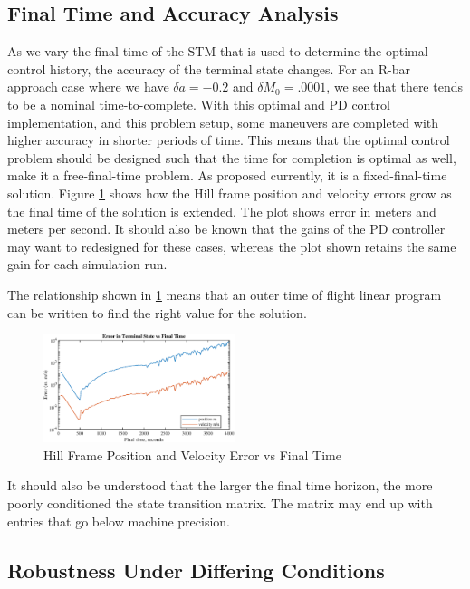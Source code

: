 \documentclass[conf]{new-aiaa}
\begin{document}
\begin{singlespace}
\subsection{Final Time and Accuracy Analysis}
As we vary the final time of the STM that is used to determine the optimal control history, the accuracy of the terminal state changes. For an R-bar approach case where we have $\delta a = -0.2$ and $\delta M_0 = .0001$, we see that there tends to be a nominal time-to-complete. With this optimal and PD control implementation, and this problem setup, some maneuvers are completed with higher accuracy in shorter periods of time. This means that the optimal control problem should be designed such that the time for completion is optimal as well, make it a free-final-time problem. As proposed currently, it is a fixed-final-time solution. Figure \ref{fig:finaltime} shows how the Hill frame position and velocity errors grow as the final time of the solution is extended. The plot shows error in meters and meters per second. It should also be known that the gains of the PD controller may want to redesigned for these cases, whereas the plot shown retains the same gain for each simulation run.

The relationship shown in \ref{fig:finaltime} means that an outer time of flight linear program can be written to find the right value for the solution. 
%
\begin{figure}[!htbp] 
  \centering
  \includegraphics[width=0.5\textwidth]{figures/finaltime.eps}
  \caption{Hill Frame Position and Velocity Error vs Final Time}
  \label{fig:finaltime}
 \end{figure}
 It should also be understood that the larger the final time horizon, the more poorly conditioned the state transition matrix. The matrix may end up with entries that go below machine precision.
%
\subsection{Robustness Under Differing Conditions}

\end{singlespace}
\end{document}
